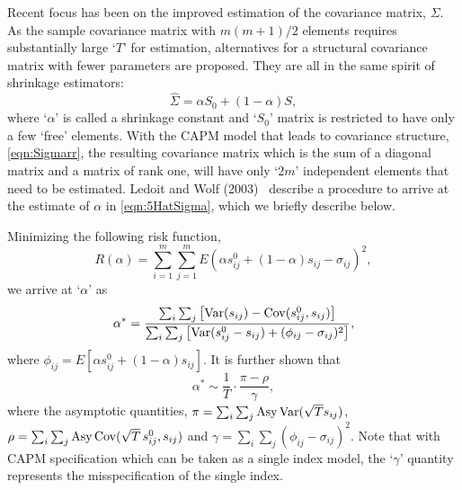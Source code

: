 Recent focus has been on the improved estimation of the covariance matrix, $\Sigma$. As the sample covariance matrix with $m(m+1)/2$ elements requires substantially large `$T$' for estimation, alternatives for a structural covariance matrix with fewer parameters are proposed. They are all in the same spirit of shrinkage estimators:
	\begin{equation} \label{eqn:5HatSigma}
	\hat{\Sigma}= \alpha S_0 + (1 - \alpha) S,
	\end{equation}
where `$\alpha$' is called a shrinkage constant and `$S_0$' matrix is restricted to have only a few `free' elements. With the CAPM model that leads to covariance structure, \eqref{eqn:Sigmarr}, the resulting covariance matrix which is the sum of a diagonal matrix and a matrix of rank one, will have only `$2m$' independent elements that need to be estimated. Ledoit and Wolf (2003)~\cite{wolf} describe a procedure to arrive at the estimate of $\alpha$ in \eqref{eqn:5HatSigma}, which we briefly describe below. 


Minimizing the following risk function,
	\begin{equation} \label{eqn:ralpha}
	R(\alpha)= \sum_{i=1}^m \sum_{j=1}^m E(\alpha s_{ij}^0 + (1-\alpha) s_{ij} - \sigma_{ij})^2,
	\end{equation}
we arrive at `$\alpha$' as
	\begin{equation}\label{eqn:bigalpha}
	\alpha^*= \dfrac{\sum_i \sum_{j} \left[ \var(s_{ij}) - \cov(s_{ij}^0, s_{ij}) \right]}{\sum_i \sum_j \left[ \var(s_{ij}^0 - s_{ij}) + (\phi_{ij} - \sigma_{ij})^2 \right]},
	\end{equation}
where $\phi_{ij}= E[\alpha s_{ij}^0 + (1 - \alpha) s_{ij}]$. It is further shown that
	\begin{equation}\label{eqn:alphastarsim}
	\alpha^* \sim \dfrac{1}{T} \cdot \dfrac{\pi - \rho}{\gamma},
	\end{equation}
where the asymptotic quantities, $\pi= \sum_i \sum_j \text{Asy} \operatorname{Var}(\sqrt{T} s_{ij})$, $\rho= \sum_i \sum_j \text{Asy} \operatorname{Cov}(\sqrt{T}\,s_{ij}^0, s_{ij})$ and $\gamma= \sum_i \sum_j (\phi_{ij} - \sigma_{ij})^2$. Note that with CAPM specification which can be taken as a single index model, the `$\gamma$' quantity represents the misspecification of the single index. 


